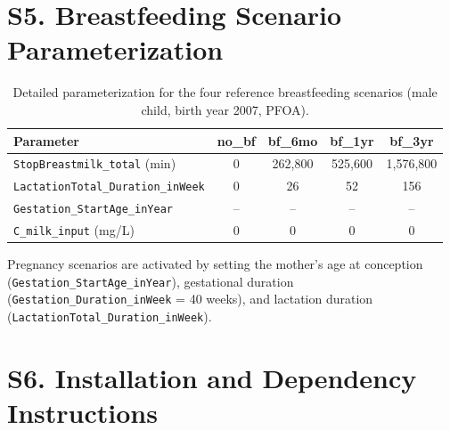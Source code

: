 \documentclass[12pt]{article}
\begin{document}

\section*{S5. Breastfeeding Scenario Parameterization}

\begin{table}[h]
\centering
\caption{Detailed parameterization for the four reference breastfeeding
scenarios (male child, birth year 2007, PFOA).}
\label{tab:scenario_params}
\begin{tabular}{lcccc}
\toprule
\textbf{Parameter} & \textbf{no\_bf} & \textbf{bf\_6mo} &
\textbf{bf\_1yr} & \textbf{bf\_3yr} \\
\midrule
\texttt{StopBreastmilk\_total} (min)
  & 0 & 262,800 & 525,600 & 1,576,800 \\
\texttt{LactationTotal\_Duration\_inWeek}
  & 0 & 26 & 52 & 156 \\
\texttt{Gestation\_StartAge\_inYear}
  & -- & -- & -- & -- \\
\texttt{C\_milk\_input} (mg/L)
  & 0 & 0 & 0 & 0 \\
\bottomrule
\end{tabular}
\end{table}


Pregnancy scenarios are activated by setting the mother's age at
conception (\texttt{Gestation\_StartAge\_inYear}), gestational
duration (\texttt{Gestation\_Duration\_inWeek} = 40 weeks), and
lactation duration (\texttt{LactationTotal\_Duration\_inWeek}).

\section*{S6. Installation and Dependency Instructions}
\end{document}
